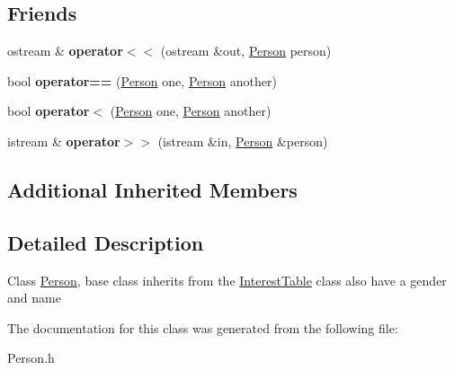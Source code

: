 \subsection*{Friends}
\begin{DoxyCompactItemize}
\item 
\hypertarget{class_person_a633b3378f40a01ac9e948b3f04788bb7}{ostream \& {\bfseries operator$<$$<$} (ostream \&out, \hyperlink{class_person}{Person} person)}\label{class_person_a633b3378f40a01ac9e948b3f04788bb7}

\item 
\hypertarget{class_person_ac1afb70fa014e4ff1b10d2fb69da1fc4}{bool {\bfseries operator==} (\hyperlink{class_person}{Person} one, \hyperlink{class_person}{Person} another)}\label{class_person_ac1afb70fa014e4ff1b10d2fb69da1fc4}

\item 
\hypertarget{class_person_a6ccca6a63aca12b55077bc9cf35c1611}{bool {\bfseries operator$<$} (\hyperlink{class_person}{Person} one, \hyperlink{class_person}{Person} another)}\label{class_person_a6ccca6a63aca12b55077bc9cf35c1611}

\item 
\hypertarget{class_person_ac88f990be8933a9a9b184b08d6b9eb06}{istream \& {\bfseries operator$>$$>$} (istream \&in, \hyperlink{class_person}{Person} \&person)}\label{class_person_ac88f990be8933a9a9b184b08d6b9eb06}

\end{DoxyCompactItemize}
\subsection*{Additional Inherited Members}


\subsection{Detailed Description}
Class \hyperlink{class_person}{Person}, base class inherits from the \hyperlink{class_interest_table}{Interest\-Table} class also have a gender and name 

The documentation for this class was generated from the following file\-:\begin{DoxyCompactItemize}
\item 
Person.\-h\end{DoxyCompactItemize}
